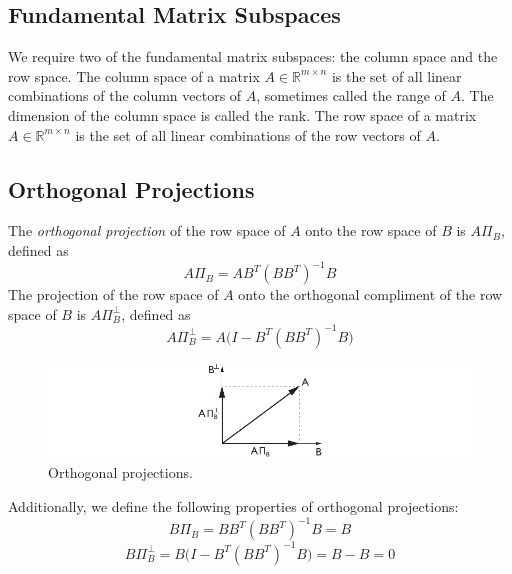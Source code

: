 \subsection{Fundamental Matrix Subspaces}
We require two of the fundamental matrix subspaces: the column space and the row space. The column space of a matrix $A \in \mathbb{R}^{m\times n}$ is the set of all linear combinations of the column vectors of $A$, sometimes called the range of $A$. The dimension of the column space is called the rank. The row space of a matrix $A \in \mathbb{R}^{m\times n}$ is the set of all linear combinations of the row vectors of $A$.


\subsection{Orthogonal Projections}
The \textit{orthogonal projection} of the row space of $A$ onto the row space of $B$ is $A\Pi_B$, defined as
\begin{equation*}
A\Pi_B = AB^T(BB^T)^{-1}B
\end{equation*}
The projection of the row space of $A$ onto the orthogonal compliment of the row space of $B$ is $A\Pi_B^\perp$, defined as
\begin{equation*}
A\Pi_B^\perp = A\big(I-B^T(BB^T)^{-1}B\big)
\end{equation*}
\begin{figure}[htb!]
	\centering
	\includegraphics{../fig/orthogonal_projection.pdf}
	\caption{Orthogonal projections.}
\end{figure}

Additionally, we define the following properties of orthogonal projections:
\begin{equation*}
B\Pi_B = BB^T(BB^T)^{-1}B = B
\end{equation*}
\begin{equation*}
B\Pi_B^\perp = B\big(I-B^T(BB^T)^{-1}B\big) = B-B = 0
\end{equation*}

